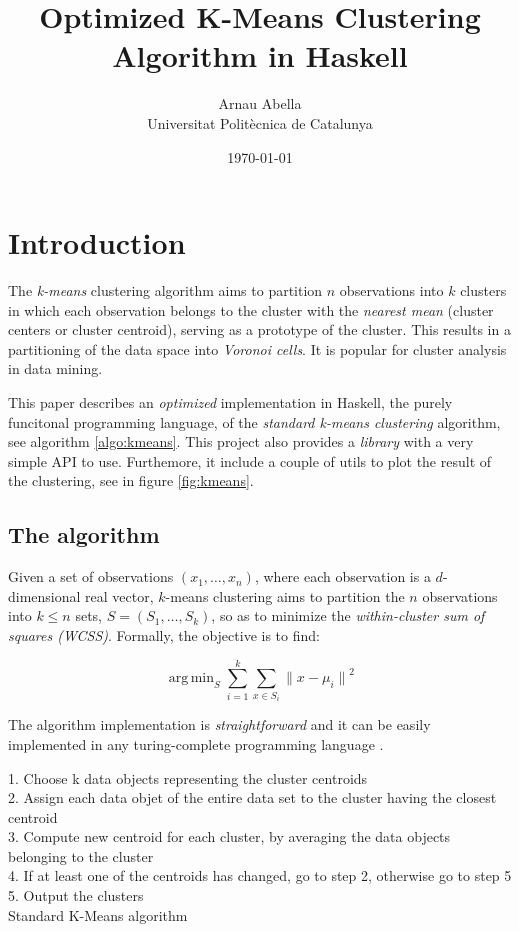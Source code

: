 \documentclass[12pt, a4paper]{article} %
\title{%
  Optimized K-Means Clustering Algorithm in Haskell\\
}
\author{%
  Arnau Abella \\
  \large{Universitat Polit\`ecnica de Catalunya}
}
\date{\today}
\DeclareMathOperator*{\argmin}{arg\,min}
\begin{document}
\maketitle

\section{Introduction}\label{s:intro}

The \textit{k-means} clustering algorithm aims to partition $n$ observations into $k$ clusters in which each observation belongs to the cluster with the \textit{nearest mean} (cluster centers or cluster centroid), serving as a prototype of the cluster. This results in a partitioning of the data space into \textit{Voronoi cells}. It is popular for cluster analysis in data mining.

This paper describes an \textit{optimized} implementation in Haskell, the purely funcitonal programming language, of the \textit{standard k-means clustering} algorithm, see algorithm \ref{algo:kmeans}. This project also provides a \textit{library} with a very simple API to use. Furthemore, it include a couple of utils to plot the result of the clustering, see in figure \ref{fig:kmeans}.

\subsection{The algorithm}\label{s:algo}

Given a set of observations $(x_1, \dots, x_n)$, where each observation is a $d$-dimensional real vector, $k$-means clustering aims to partition the $n$ observations into $k \leq n$ sets, $S = (S_1, \dots, S_k)$, so as to minimize the \textit{within-cluster sum of squares (WCSS)}. Formally, the objective is to find:

\begin{equation}\label{eq:objective}
  \argmin_{S} \sum_{i=1}^k \sum_{x \in S_i} {\|x - \mu_i\|}^2
\end{equation}

The algorithm implementation is \textit{straightforward} and it can be easily implemented in any turing-complete programming language \cite{mohammed}.

\begin{algorithm}[h]
  1. Choose k data objects representing the cluster centroids \\
  2. Assign each data objet of the entire data set to the cluster having the closest centroid \\
  3. Compute new centroid for each cluster, by averaging the data objects belonging to the cluster \\
  4. If at least one of the centroids has changed, go to step 2, otherwise go to step 5 \\
  5. Output the clusters \\
  \caption{Standard K-Means algorithm}
  \label{algo:kmeans}
\end{algorithm}
\end{document}
